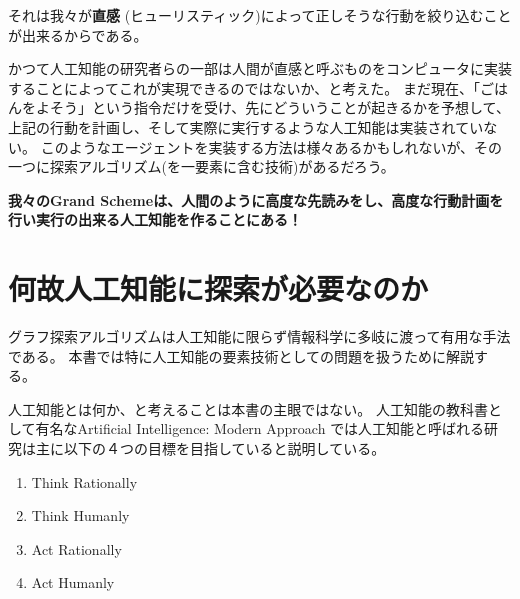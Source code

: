 \documentclass[b5paper]{report}
\begin{document}
それは我々が{\bf 直感} (ヒューリスティック)によって正しそうな行動を絞り込むことが出来るからである。

かつて人工知能の研究者らの一部は人間が直感と呼ぶものをコンピュータに実装することによってこれが実現できるのではないか、と考えた。
まだ現在、「ごはんをよそう」という指令だけを受け、先にどういうことが起きるかを予想して、上記の行動を計画し、そして実際に実行するような人工知能は実装されていない。
このようなエージェントを実装する方法は様々あるかもしれないが、その一つに探索アルゴリズム(を一要素に含む技術)があるだろう。

{\bf 我々のGrand Schemeは、人間のように高度な先読みをし、高度な行動計画を行い実行の出来る人工知能を作ることにある！}






\section{何故人工知能に探索が必要なのか}
\label{sec:why-search}

グラフ探索アルゴリズムは人工知能に限らず情報科学に多岐に渡って有用な手法である。
本書では特に人工知能の要素技術としての問題を扱うために解説する。

人工知能とは何か、と考えることは本書の主眼ではない。
人工知能の教科書として有名なArtificial Intelligence: Modern Approach \cite{russelln03}では人工知能と呼ばれる研究は主に以下の４つの目標を目指していると説明している。

\begin{enumerate}
\item Think Rationally
\item Think Humanly
\item Act Rationally
\item Act Humanly
\end{enumerate}
\end{document}
